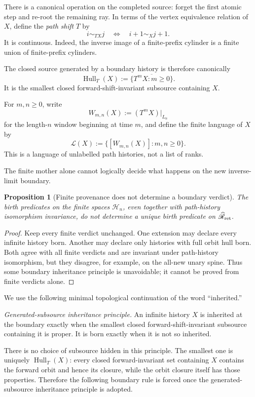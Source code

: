 \documentclass[11pt]{article}
\newtheorem{proposition}[theorem]{Proposition}
\begin{document}
There is a canonical operation on the completed source: forget the first
atomic step and re-root the remaining ray.  In terms of the vertex equivalence
relation of \(X\), define the \emph{path shift} \(T\) by
\[
i\sim_{TX}j
\quad\Longleftrightarrow\quad
i+1\sim_Xj+1.
\]
It is continuous.  Indeed, the inverse image of a finite-prefix cylinder is a
finite union of finite-prefix cylinders.

The closed source generated by a boundary history is therefore canonically
\[
\operatorname{Hull}_T(X)
:=
\overline{\{T^mX:m\ge0\}}.
\]
It is the smallest closed forward-shift-invariant subsource containing \(X\).

For \(m,n\ge0\), write
\[
W_{m,n}(X):=(T^mX)|_{L_n}
\]
for the length-\(n\) window beginning at time \(m\), and define the finite
language of \(X\) by
\[
\mathcal L(X)
:=
\{[W_{m,n}(X)]:m,n\ge0\}.
\]
This is a language of unlabelled path histories, not a list of ranks.

The finite mother alone cannot logically decide what happens on the new
inverse-limit boundary.

\begin{proposition}[Finite provenance does not determine a boundary verdict]
\label{prop:finite-not-boundary}
The birth predicates on the finite spaces \(\mathscr H_n\), even together
with path-history isomorphism invariance, do not determine a unique birth
predicate on \(\widehat{\mathscr R}_{\rm ret}\).
\end{proposition}

\begin{proof}
Keep every finite verdict unchanged.  One extension may declare every
infinite history born.  Another may declare only histories with full orbit
hull born.  Both agree with all finite verdicts and are invariant under
path-history isomorphism, but they disagree, for example, on the all-new unary
spine.
Thus some boundary inheritance principle is unavoidable; it cannot be proved
from finite verdicts alone.
\end{proof}

We use the following minimal topological continuation of the word
``inherited.''

\medskip
\noindent\emph{Generated-subsource inheritance principle.}
An infinite history \(X\) is inherited at the boundary exactly when the
smallest closed forward-shift-invariant subsource containing it is proper.
It is born exactly when it is not so inherited.
\medskip

There is no choice of subsource hidden in this principle.  The smallest one
is uniquely \(\operatorname{Hull}_T(X)\): every closed forward-invariant set
containing \(X\) contains the forward orbit and hence its closure, while the
orbit closure itself has those properties.  Therefore the following boundary
rule is forced once the generated-subsource inheritance principle is adopted.
\end{document}

